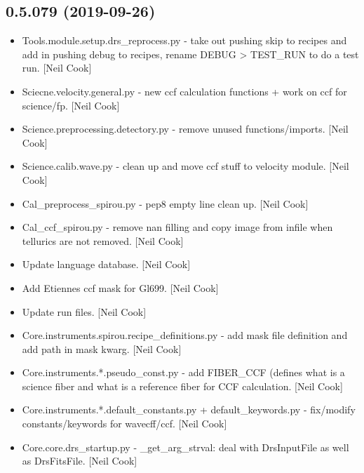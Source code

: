 \documentclass[a4paper,10pt,english]{report}
\begin{document}
\subsection{0.5.079 (2019-09-26)}
\label{\detokenize{misc/changelog:id62}}\begin{itemize}
\item {} 
Tools.module.setup.drs\_reprocess.py - take out pushing skip to recipes
and add in pushing debug to recipes, rename DEBUG \textendash{}\textgreater{} TEST\_RUN to do a
test run. {[}Neil Cook{]}

\item {} 
Sciecne.velocity.general.py - new ccf calculation functions + work on
ccf for science/fp. {[}Neil Cook{]}

\item {} 
Science.preprocessing.detectory.py - remove unused functions/imports.
{[}Neil Cook{]}

\item {} 
Science.calib.wave.py - clean up and move ccf stuff to velocity
module. {[}Neil Cook{]}

\item {} 
Cal\_preprocess\_spirou.py - pep8 empty line clean up. {[}Neil Cook{]}

\item {} 
Cal\_ccf\_spirou.py - remove nan filling and copy image from infile when
tellurics are not removed. {[}Neil Cook{]}

\item {} 
Update language database. {[}Neil Cook{]}

\item {} 
Add Etiennes ccf mask for Gl699. {[}Neil Cook{]}

\item {} 
Update run files. {[}Neil Cook{]}

\item {} 
Core.instruments.spirou.recipe\_definitions.py - add mask file
definition and add path in \textendash{}mask kwarg. {[}Neil Cook{]}

\item {} 
Core.instruments.*.pseudo\_const.py - add FIBER\_CCF (defines what is a
science fiber and what is a reference fiber for CCF calculation. {[}Neil
Cook{]}

\item {} 
Core.instruments.*.default\_constants.py + default\_keywords.py -
fix/modify constants/keywords for wavecff/ccf. {[}Neil Cook{]}

\item {} 
Core.core.drs\_startup.py - \_get\_arg\_strval: deal with DrsInputFile as
well as DrsFitsFile. {[}Neil Cook{]}


\end{itemize}
\end{document}
